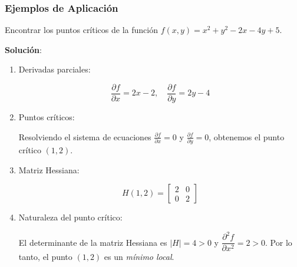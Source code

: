 \subsubsection{Ejemplos de Aplicación}

\begin{example}
	
	Encontrar los puntos críticos de la función $f(x,y) = x^2 + y^2 - 2x - 4y + 5$.
	
	\textbf{Solución}:
	
	\begin{enumerate}
		\item Derivadas parciales:
		
		$$\dfrac{\partial f}{\partial x} = 2x - 2, \quad \dfrac{\partial f}{\partial y} = 2y - 4$$
		
		\item Puntos críticos:
		
		Resolviendo el sistema de ecuaciones $\frac{\partial f}{\partial x} = 0$ y $\frac{\partial f}{\partial y} = 0$, obtenemos el punto crítico $(1, 2)$.
		
		\item Matriz Hessiana:
		
		$$H(1, 2) = \begin{bmatrix} 2 & 0 \\ 0 & 2 \end{bmatrix}$$
		
		\item Naturaleza del punto crítico:
		
		El determinante de la matriz Hessiana es $|H| = 4 > 0$ y $\dfrac{\partial^2 f}{\partial x^2} = 2 > 0$. Por lo tanto, el punto $(1, 2)$ es un \textit{mínimo local}.
	\end{enumerate}
\end{example}


